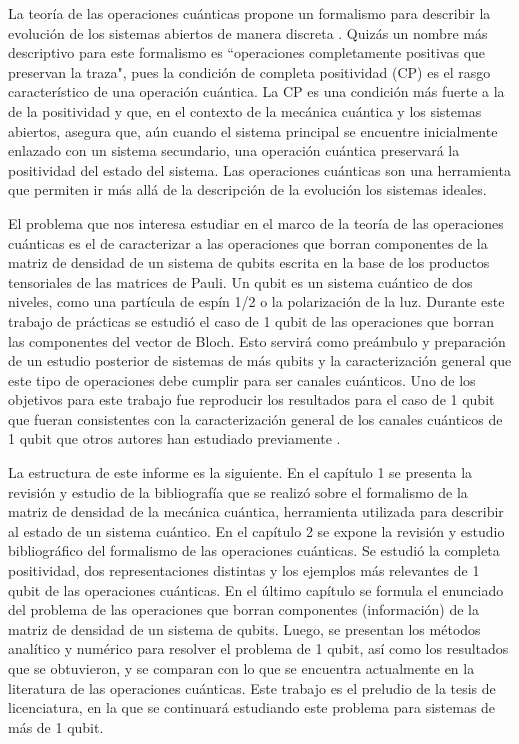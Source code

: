 La teoría de las operaciones cuánticas propone un formalismo para
describir la evolución de los sistemas abiertos de manera discreta
\cite{nielsen_chuang_2011}. 
Quizás un nombre más descriptivo para este formalismo es 
``operaciones completamente positivas que preservan la traza",
pues la condición de completa positividad (CP) es el rasgo característico 
de una operación cuántica. La CP es una condición más fuerte  
a la de la positividad y que, en el contexto de la
mecánica cuántica y los sistemas abiertos, asegura que, aún 
cuando el sistema principal se encuentre inicialmente enlazado 
con un sistema secundario, una operación cuántica preservará 
la positividad del estado del sistema. Las operaciones cuánticas 
son una herramienta que permiten ir más allá de la descripción 
de la evolución los sistemas ideales. 

El problema que nos interesa estudiar en el marco de la teoría de 
las operaciones cuánticas es el de caracterizar a las
operaciones que borran componentes de la matriz de densidad
de un sistema de qubits escrita en la base de los productos 
tensoriales de las matrices de Pauli. Un qubit es un sistema cuántico de dos niveles, 
como una partícula de espín 1/2 o la polarización de la luz. 
Durante este trabajo de prácticas se estudió el caso de 1 qubit de las 
operaciones que borran las componentes del vector de Bloch. Esto 
servirá como preámbulo y preparación de un estudio posterior 
de sistemas de más qubits y la caracterización general que este
tipo de operaciones debe cumplir para ser canales cuánticos.
Uno de los objetivos para este trabajo fue reproducir los
resultados para el caso de 1 qubit que fueran 
consistentes con la caracterización general de 
los canales cuánticos de 1 qubit que otros autores han 
estudiado previamente 
\cite{bengtsson_zyczkowski_2017,nielsen_chuang_2011}.

La estructura de este informe es la siguiente. En el capítulo 1
se presenta la revisión y estudio de la bibliografía que se realizó 
sobre el formalismo de la matriz de densidad de la mecánica cuántica, 
herramienta utilizada para describir 
al estado de un sistema cuántico. En el capítulo 2 se expone 
la revisión y estudio bibliográfico del formalismo de las 
operaciones cuánticas. Se estudió la completa positividad, 
dos representaciones distintas y los ejemplos más relevantes 
de 1 qubit de las operaciones cuánticas. En el último capítulo
se formula el enunciado del problema de las operaciones que borran 
componentes (información) de la matriz de densidad de un sistema de 
qubits. Luego, se presentan los métodos analítico y numérico 
para resolver el problema de 1 qubit, así como los resultados 
que se obtuvieron, y se comparan con lo que se encuentra actualmente
en la literatura de las operaciones cuánticas. Este trabajo 
es el preludio de la tesis de licenciatura, en la que se continuará 
estudiando este problema para sistemas de más de 1 qubit.


